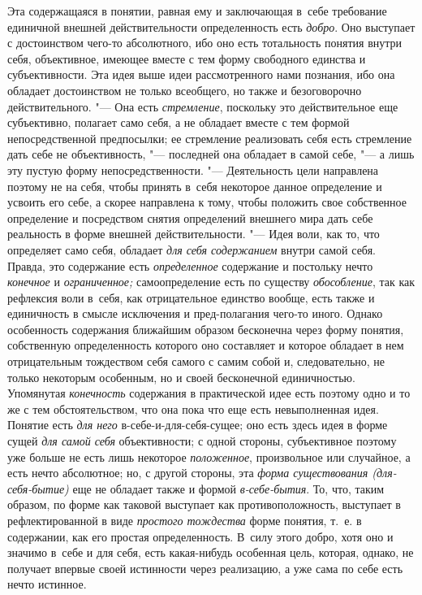 Эта содержащаяся в понятии, равная ему и заключающая в~себе
требование единичной внешней действительности определенность
есть {\em добро}.
Оно выступает с достоинством чего-то абсолютного, ибо оно
есть тотальность понятия внутри себя, объективное, имеющее вместе с тем
форму свободного единства и субъективности. Эта идея выше идеи
рассмотренного нами познания, ибо она обладает достоинством не только
всеобщего, но также и безоговорочно действительного. "--- Она
есть {\em стремление},
поскольку это действительное еще субъективно, полагает само
себя, а не обладает вместе с тем формой непосредственной предпосылки; ее
стремление реализовать себя есть стремление дать себе не объективность, "---
последней она обладает в самой себе, "--- а лишь
эту пустую форму непосредственности. "--- Деятельность цели
направлена поэтому не на себя, чтобы принять в~себя некоторое данное
определение и усвоить его себе, а скорее направлена к тому, чтобы положить
свое собственное определение и посредством снятия определений внешнего мира
дать себе реальность в форме внешней действительности. "---
Идея воли, как то, что определяет само себя, обладает
{\em для себя содержанием}
внутри самой себя. Правда, это содержание есть
{\em определенное}
содержание и постольку нечто
{\em конечное} и
{\em ограниченное;}
самоопределение есть по существу
{\em обособление}, так
как рефлексия воли в~себя, как отрицательное единство вообще, есть также и
единичность в смысле исключения и пред-полагания чего-то
иного. Однако особенность содержания ближайшим образом бесконечна через
форму понятия, собственную определенность которого оно составляет и которое
обладает в нем отрицательным тождеством себя самого с самим собой и,
следовательно, не только некоторым особенным, но и своей бесконечной
единичностью. Упомянутая
{\em конечность}
содержания в практической идее есть поэтому одно и то же с
тем обстоятельством, что она пока что еще есть невыполненная идея. Понятие
есть {\em для него}
в-себе-и-для-себя-сущее; оно есть здесь идея в форме сущей
{\em для самой себя}
объективности; с одной стороны, субъективное поэтому уже
больше не есть лишь некоторое
{\em положенное},
произвольное или случайное, а есть нечто абсолютное; но, с
другой стороны, эта {\em форма
существования (для-себя-бытие)} еще не обладает также и
формой {\em в-себе-бытия}.
То, что, таким образом, по форме как таковой выступает как
противоположность, выступает в рефлектированной в виде
{\em простого тождества}
форме понятия, т.~е. в содержании, как его простая
определенность. В~силу этого добро, хотя оно и значимо в~себе и для себя,
есть какая-нибудь особенная цель, которая, однако, не получает впервые
своей истинности через реализацию, а уже сама по себе есть нечто
истинное.

